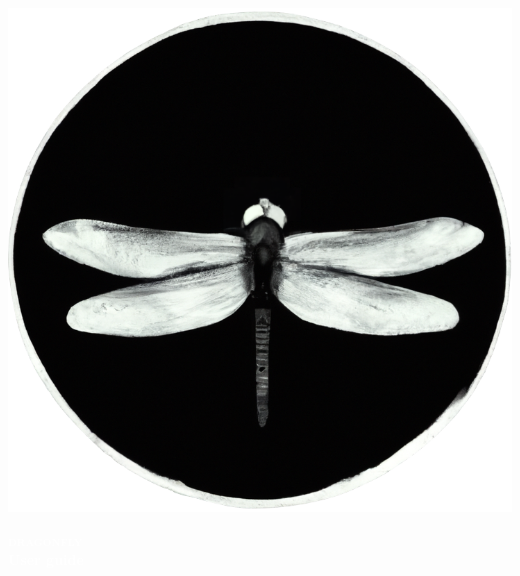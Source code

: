 \documentclass[11pt]{article}
\begin{document}

\pagecolor{black}


\vspace*{9cm}

\begin{center}
	\includegraphics[width=.3\textwidth]{logo.png}

	\vspace*{5cm}

	\Huge \bfseries \textcolor{white}{\textsc{dragonfly}} \\
	\Huge \bfseries \textcolor{white}{User guide}
  
\end{center}

\end{document}
